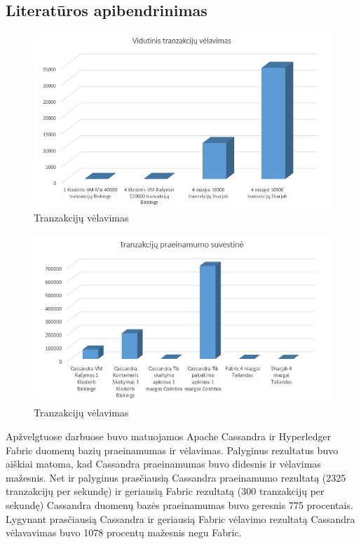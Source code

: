 \documentclass{VUMIFPSkursinis}
\begin{document}
	\subsection{Literatūros apibendrinimas}
		\begin{figure}[H]
		    \centering
		    \includegraphics[scale=0.5]{img/CasHypLat}
		    \caption{Tranzakcijų vėlavimas}   %
		    \label{img:mlp}
		\end{figure}
		\begin{figure}[H]
		    \centering
		    \includegraphics[scale=0.5]{img/CasHypTp}
		    \caption{Tranzakcijų vėlavimas}   %
		    \label{img:mlp}
		\end{figure}

Apžvelgtuose darbuose buvo matuojamos Apache Cassandra ir Hyperledger Fabric duomenų bazių praeinamumas ir vėlavimas.
Palyginus rezultatus buvo aiškiai matoma, kad Cassandra praeinamumas buvo didesnis ir vėlavimas mažesnis. 
Net ir palyginus prasčiausią Cassandra praeinamumo rezultatą (2325 tranzakcijų per sekundę) ir geriausią Fabric rezultatą (300 tranzakcijų per sekundę) Cassandra duomenų bazės praeinamumas buvo geresnis 775 procentais. Lygynant prasčiausią Cassandra ir geriausią Fabric vėlavimo rezultatą Cassandra vėlavavimas buvo 1078 procentų mažesnis negu Fabric.
\end{document}
